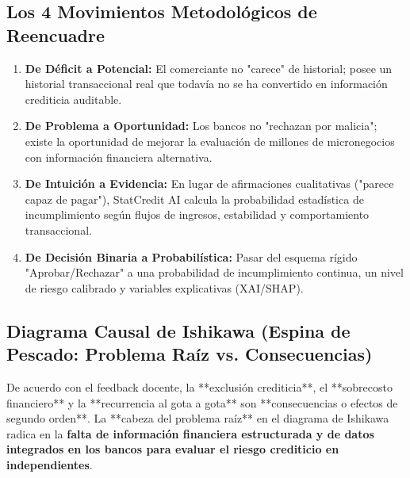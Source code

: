\documentclass[11pt,a4paper]{article}
\begin{document}
\subsection{Los 4 Movimientos Metodológicos de Reencuadre}
\begin{enumerate}
    \item \textbf{De Déficit a Potencial:} El comerciante no "carece" de historial; posee un historial transaccional real que todavía no se ha convertido en información crediticia auditable.
    \item \textbf{De Problema a Oportunidad:} Los bancos no "rechazan por malicia"; existe la oportunidad de mejorar la evaluación de millones de micronegocios con información financiera alternativa.
    \item \textbf{De Intuición a Evidencia:} En lugar de afirmaciones cualitativas ("parece capaz de pagar"), StatCredit AI calcula la probabilidad estadística de incumplimiento según flujos de ingresos, estabilidad y comportamiento transaccional.
    \item \textbf{De Decisión Binaria a Probabilística:} Pasar del esquema rígido "Aprobar/Rechazar" a una probabilidad de incumplimiento continua, un nivel de riesgo calibrado y variables explicativas (XAI/SHAP).
\end{enumerate}

\subsection{Diagrama Causal de Ishikawa (Espina de Pescado: Problema Raíz vs. Consecuencias)}
De acuerdo con el feedback docente, la **exclusión crediticia**, el **sobrecosto financiero** y la **recurrencia al gota a gota** son **consecuencias o efectos de segundo orden**. La **cabeza del problema raíz** en el diagrama de Ishikawa radica en la \textbf{falta de información financiera estructurada y de datos integrados en los bancos para evaluar el riesgo crediticio en independientes}.
\end{document}
